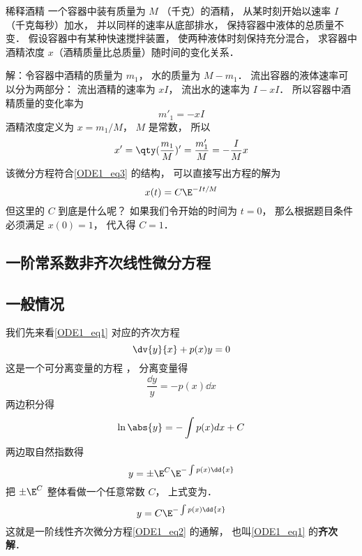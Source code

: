 \begin{example}{稀释酒精}
一个容器中装有质量为 $M$ （千克）的酒精， 从某时刻开始以速率 $I$ （千克每秒）加水， 并以同样的速率从底部排水， 保持容器中液体的总质量不变． 假设容器中有某种快速搅拌装置， 使两种液体时刻保持充分混合， 求容器中酒精浓度 $x$（酒精质量比总质量）随时间的变化关系．

解：令容器中酒精的质量为 $m_1$， 水的质量为 $M - m_1$． 流出容器的液体速率可以分为两部分： 流出酒精的速率为 $xI$， 流出水的速率为 $I - xI$． 所以容器中酒精质量的变化率为
\begin{equation}
m'_1 = -xI
\end{equation}
酒精浓度定义为 $x = m_1/M$， $M$ 是常数， 所以
\begin{equation}
x' = \qty(\frac{m_1}{M})' = \frac{m'_1}{M} = -\frac{I}{M}x
\end{equation}
该微分方程符合\autoref{ODE1_eq3} 的结构， 可以直接写出方程的解为
\begin{equation}
x(t) = C\E^{-It/M}
\end{equation}
但这里的 $C$ 到底是什么呢？ 如果我们令开始的时间为 $t = 0$， 那么根据题目条件必须满足 $x(0) = 1$， 代入得 $C = 1$．
\end{example}

\subsection{一阶常系数非齐次线性微分方程}

\subsection{一般情况}
我们先来看\autoref{ODE1_eq1} 对应的齐次方程
\begin{equation}\label{ODE1_eq2}
\dv{y}{x} + p(x)y = 0
\end{equation}
这是一个可分离变量的方程%
， 分离变量得
\begin{equation}
\frac{\dd{y}}{y} = -p(x) \dd{x}
\end{equation}
两边积分得
\begin{equation}
\ln\abs{y} = -\int p(x) dx + C
\end{equation}
两边取自然指数得
\begin{equation}
y = \pm \E^C \E^{-\int p(x) \dd{x}}
\end{equation}
把 $\pm \E^C $ 整体看做一个任意常数 $C$， 上式变为．
\begin{equation}\label{ODE1_eq6}
y = C \E^{-\int p(x) \dd{x}}
\end{equation}
这就是一阶线性齐次微分方程\autoref{ODE1_eq2} 的通解， 也叫\autoref{ODE1_eq1} 的\textbf{齐次解}．

